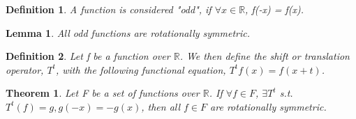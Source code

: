 \documentclass{article}
\newtheorem{definition}{Definition}
\newtheorem{lemma}{Lemma}
\newtheorem{theorem}{Theorem}
\begin{document}
\begin{definition}
  A function is considered "odd", if $\forall x \in \mathbb{R}$, f(-x) = f(x).
\end{definition}

\begin{lemma}
  All odd functions are rotationally symmetric.
\end{lemma}

\begin{definition}
  Let f be a function over $\mathbb{R}$. We then define the shift or translation operator, $T^t$, with the following
  functional equation, $T^t f(x) = f(x+t)$.
\end{definition}

\begin{theorem}
  Let F be a set of functions over $\mathbb{R}$. If $\forall f\in F$, $\exists T^t$
  s.t. $T^t(f) = g, g(-x) = -g(x)$, then all $f \in F$ are rotationally symmetric.
\end{theorem}
\end{document}
